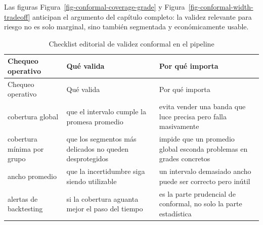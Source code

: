 \documentclass[
  spanish,
  11pt,
  letterpaper,
]{scrbook}
\theoremstyle{plain}
\theoremstyle{remark}
\begin{document}
Las figuras Figura~\ref{fig-conformal-coverage-grade} y
Figura~\ref{fig-conformal-width-tradeoff} anticipan el argumento del
capítulo completo: la validez relevante para riesgo no es solo marginal,
sino también segmentada y económicamente usable.

\begin{longtable}[]{@{}
  >{\raggedright\arraybackslash}p{}
  >{\raggedright\arraybackslash}p{}
  >{\raggedright\arraybackslash}p{}@{}}
\caption{Checklist editorial de validez conformal en el
pipeline}\label{tbl-conformal-checklist}\tabularnewline
\toprule\noalign{}
\begin{minipage}[b]{\linewidth}\raggedright
Chequeo operativo
\end{minipage} & \begin{minipage}[b]{\linewidth}\raggedright
Qué valida
\end{minipage} & \begin{minipage}[b]{\linewidth}\raggedright
Por qué importa
\end{minipage} \\
\midrule\noalign{}
\endfirsthead
\toprule\noalign{}
\begin{minipage}[b]{\linewidth}\raggedright
Chequeo operativo
\end{minipage} & \begin{minipage}[b]{\linewidth}\raggedright
Qué valida
\end{minipage} & \begin{minipage}[b]{\linewidth}\raggedright
Por qué importa
\end{minipage} \\
\midrule\noalign{}
\endhead
\bottomrule\noalign{}
\endlastfoot
cobertura global & que el intervalo cumple la promesa promedio & evita
vender una banda que luce precisa pero falla masivamente \\
cobertura mínima por grupo & que los segmentos más delicados no queden
desprotegidos & impide que un promedio global esconda problemas en
grades concretos \\
ancho promedio & que la incertidumbre siga siendo utilizable & un
intervalo demasiado ancho puede ser correcto pero inútil \\
alertas de backtesting & si la cobertura aguanta mejor el paso del
tiempo & es la parte prudencial de conformal, no solo la parte
estadística \\
\end{longtable}
\end{document}
